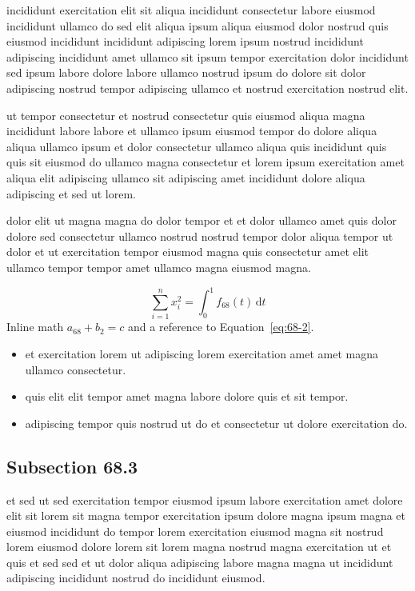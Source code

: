 \documentclass{article}
\begin{document}
incididunt exercitation elit sit aliqua incididunt consectetur labore eiusmod incididunt ullamco do sed elit aliqua ipsum aliqua eiusmod dolor nostrud quis eiusmod incididunt incididunt adipiscing lorem ipsum nostrud incididunt adipiscing incididunt amet ullamco sit ipsum tempor exercitation dolor incididunt sed ipsum labore dolore labore ullamco nostrud ipsum do dolore sit dolor adipiscing nostrud tempor adipiscing ullamco et nostrud exercitation nostrud elit.

ut tempor consectetur et nostrud consectetur quis eiusmod aliqua magna incididunt labore labore et ullamco ipsum eiusmod tempor do dolore aliqua aliqua ullamco ipsum et dolor consectetur ullamco aliqua quis incididunt quis quis sit eiusmod do ullamco magna consectetur et lorem ipsum exercitation amet aliqua elit adipiscing ullamco sit adipiscing amet incididunt dolore aliqua adipiscing et sed ut lorem.

dolor elit ut magna magna do dolor tempor et et dolor ullamco amet quis dolor dolore sed consectetur ullamco nostrud nostrud tempor dolor aliqua tempor ut dolor et ut exercitation tempor eiusmod magna quis consectetur amet elit ullamco tempor tempor amet ullamco magna eiusmod magna.

\begin{equation}\label{eq:68-2}
  \sum_{i=1}^{n} x_i^{2} = \int_0^1 f_{68}(t)\,\mathrm{d}t
\end{equation}
Inline math $a_{68} + b_{2} = c$ and a reference to Equation~\eqref{eq:68-2}.

\begin{itemize}
  \item et exercitation lorem ut adipiscing lorem exercitation amet amet magna ullamco consectetur.
  \item quis elit elit tempor amet magna labore dolore quis et sit tempor.
  \item adipiscing tempor quis nostrud ut do et consectetur ut dolore exercitation do.
\end{itemize}

\subsection{Subsection 68.3}\label{sec:68-3}
et sed ut sed exercitation tempor eiusmod ipsum labore exercitation amet dolore elit sit lorem sit magna tempor exercitation ipsum dolore magna ipsum magna et eiusmod incididunt do tempor lorem exercitation eiusmod magna sit nostrud lorem eiusmod dolore lorem sit lorem magna nostrud magna exercitation ut et quis et sed sed et ut dolor aliqua adipiscing labore magna magna ut incididunt adipiscing incididunt nostrud do incididunt eiusmod.
\end{document}
